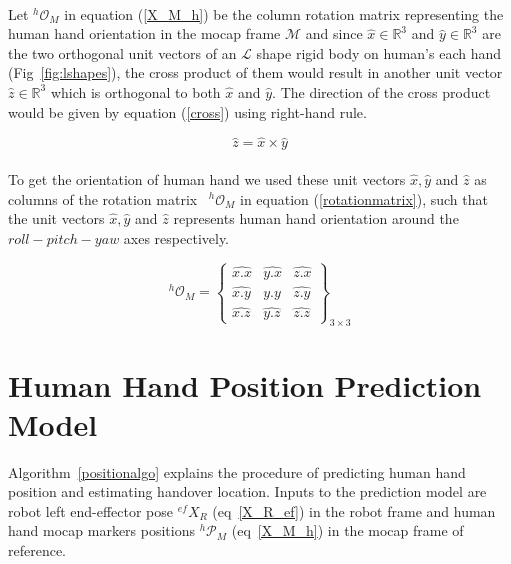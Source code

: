 \documentclass[a4paper, 12pt, oneside]{Thesis}  %
\begin{document}
\paragraph*{}
Let ${}^{h}\mathcal{O}_{M}$ in equation (\ref{X_M_h}) be the column rotation matrix representing the human hand orientation in the mocap frame $\mathcal{M}$ and since $\hat{x} \in \mathbb{R}^{3}$ and $\hat{y} \in \mathbb{R}^{3}$ are the two orthogonal unit vectors of an $\mathcal{L}$ shape rigid body on human's each hand (Fig~\ref{fig:lshapes}), the cross product of them would result in another unit vector $\hat{z} \in \mathbb{R}^{3}$ which is orthogonal to both $\hat{x}$ and $\hat{y}$. The direction of the cross product would be given by equation (\ref{cross}) using right-hand rule.


\begin{equation}\label{cross}
\hat{z} = \hat{x} \times \hat{y}
\end{equation}


\paragraph*{}
To get the orientation of human hand we used these unit vectors $\hat{x}, \hat{y}$ and $\hat{z}$ as columns of the rotation matrix~\cite{evans2001rotations, altmann2005rotations, jia2017rotation} ${}^{h}\mathcal{O}_{M}$ in equation (\ref{rotationmatrix}), such that the unit vectors $\hat{x}, \hat{y}$ and $\hat{z}$ represents human hand orientation around the $roll-pitch-yaw$ axes respectively.

\begin{equation}\label{rotationmatrix}
{}^{h}\mathcal{O}_{M} = 
\left\{\begin{array}{cccc}
\hat{x.x} & \hat{y.x} & \hat{z.x} \\
\hat{x.y} & \hat{y.y} & \hat{z.y} \\
\hat{x.z} & \hat{y.z} & \hat{z.z}
\end{array}\right\}_{3\times 3}
\end{equation}



\clearpage

\section{Human Hand Position Prediction Model}\label{prediction_model}
Algorithm~\ref{positionalgo} explains the procedure of predicting human hand position and estimating handover location. Inputs to the prediction model are robot left end-effector pose $\mathcal{}^{ef}{X}_R$ (eq~\ref{X_R_ef}) in the robot frame and human hand mocap markers positions ${}^{h}\mathcal{P}_M$ (eq~\ref{X_M_h}) in the mocap frame of reference.
\end{document}

